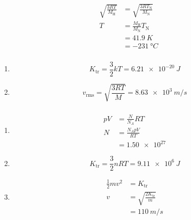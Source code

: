 \documentclass{article}
\begin{document}
\subsubsection{}

\begin{align*}
  \sqrt{\frac{3 R T}{M_\text{H}}} & = \sqrt{\frac{3 R T_\text{N}}{M_\text{N}}} \\
  T                               & = \frac{M_\text{H}}{M_\text{N}} T_\text{N} \\
                                  & = \qty{41.9}{K}                            \\
                                  & = \qty{-231}{\degree C}
\end{align*}

\subsubsection{}

\begin{enumerate}
  \item \[K_\text{tr} = \frac{3}{2} k T = \qty{6.21e-20}{J}\]

  \item \[v_\text{rms} = \sqrt{\frac{3 R T}{M}} = \qty{8.63e3}{m/s}\]
\end{enumerate}

\subsubsection{}

\begin{enumerate}
  \item

        \begin{align*}
          p V & = \frac{N}{N_A} R T   \\
          N   & = \frac{N_A p V}{R T} \\
              & = \num{1.50e27}
        \end{align*}

  \item \[K_\text{tr} = \frac{3}{2} n R T = \qty{9.11e6}{J}\]

  \item

        \begin{align*}
          \frac{1}{2} m v^2 & = K_\text{tr}                    \\
          v                 & = \sqrt{\frac{2 K_\text{tr}}{m}} \\
                            & = \qty{110}{m/s}
        \end{align*}
\end{enumerate}
\end{document}
